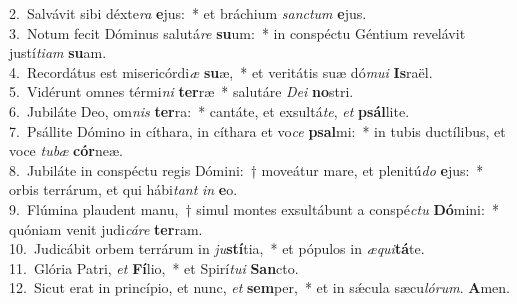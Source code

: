 {2.~}Salvávit sibi déxte\textit{ra} \textbf{e}jus:~* et bráchium \textit{san}\textit{ctum} \textbf{e}jus.\\
{3.~}Notum fecit Dóminus salutá\textit{re} \textbf{su}um:~* in conspéctu Géntium revelávit justí\textit{ti}\textit{am} \textbf{su}am.\\
{4.~}Recordátus est misericórdi\textit{æ} \textbf{su}æ,~* et veritátis suæ dó\textit{mu}\textit{i} \textbf{Is}raël.\\
{5.~}Vidérunt omnes térmi\textit{ni} \textbf{ter}ræ~* salutáre \textit{De}\textit{i} \textbf{no}stri.\\
{6.~}Jubiláte Deo, om\textit{nis} \textbf{ter}ra:~* cantáte, et exsultá\textit{te}, \textit{et} \textbf{psál}lite.\\
{7.~}Psállite Dómino in cíthara, in cíthara et vo\textit{ce} \textbf{psal}mi:~* in tubis ductílibus, et voce \textit{tu}\textit{bæ} \textbf{cór}neæ.\\
{8.~}Jubiláte in conspéctu regis Dómini:~† moveátur mare, et plenitú\textit{do} \textbf{e}jus:~* orbis terrárum, et qui hábi\textit{tant} \textit{in} \textbf{e}o.\\
{9.~}Flúmina plaudent manu,~† simul montes exsultábunt a conspé\textit{ctu} \textbf{Dó}mini:~* quóniam venit judi\textit{cá}\textit{re} \textbf{ter}ram.\\
{10.~}Judicábit orbem terrárum in \textit{ju}\textbf{stí}tia,~* et pópulos in \textit{æ}\textit{qui}\textbf{tá}te.\\
{11.~}Glória Patri, \textit{et} \textbf{Fí}lio,~* et Spirí\textit{tu}\textit{i} \textbf{San}cto.\\
{12.~}Sicut erat in princípio, et nunc, \textit{et} \textbf{sem}per,~* et in sǽcula sæcu\textit{ló}\textit{rum}. \textbf{A}men.\\
